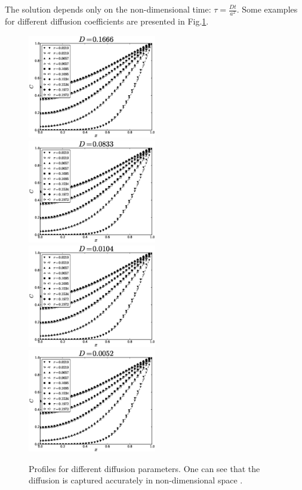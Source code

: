 \documentclass{article}
\begin{document}
The solution depends only on the non-dimensional time: $\tau=\frac{D t}{a^2}$. Some examples for
different diffusion coefficients are presented in Fig.\ref{fig:cylinder:benchmark}.
\begin{figure}[htb!]
\includegraphics[width=0.5\textwidth]{Figures/cylinder1666.eps}
\includegraphics[width=0.5\textwidth]{Figures/cylinder0833.eps}\\
\includegraphics[width=0.5\textwidth]{Figures/cylinder0104.eps}
\includegraphics[width=0.5\textwidth]{Figures/cylinder0052.eps}\\
\caption{Profiles for different diffusion parameters. One can see that the diffusion is captured
accurately in non-dimensional space \label{fig:cylinder:benchmark}.}
\end{figure}
\end{document}
